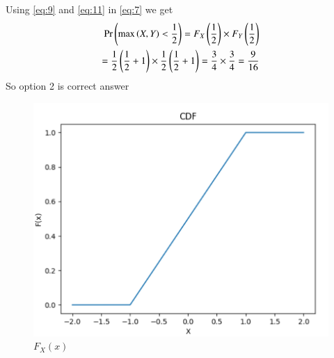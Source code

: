 \documentclass[journal,12pt,twocolumn]{IEEEtran}
\begin{document}
Using  \eqref{eq:9} and \eqref{eq:11} in \eqref{eq:7} we get
\begin{align}
\Pr\left(\max\left(X,Y\right) < \dfrac{1}{2}\right)=F_{X}\left(\dfrac{1}{2} \right)\times F_{Y}\left(\dfrac{1}{2} \right)\\
=\dfrac{1}{2} \left(\dfrac{1}{2}+ 1 \right) \times \dfrac{1}{2} \left( \dfrac{1}{2}+1 \right)=\dfrac{3}{4} \times \dfrac{3}{4}= \dfrac{9}{16}
\end{align} 
So option 2 is correct answer 
\begin{figure}[h]
    \centering
    \includegraphics[width=\columnwidth]{cdf.png}
    \caption{$F_{X}(x)$}
    \label{fig:$F_{X}(x)$}
\end{figure}
\end{document}
